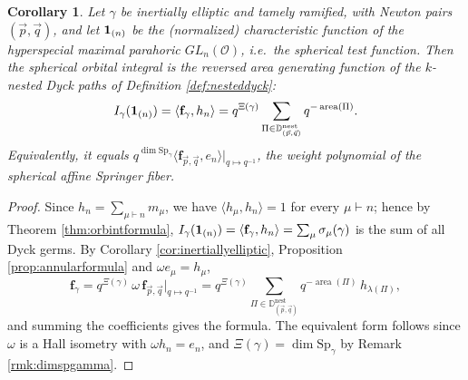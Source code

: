 \documentclass{amsart}
\numberwithin{equation}{section}
\newtheorem{corollary}[lemma]{Corollary}%
\theoremstyle{definition}
\def\16{{\bf 16}}
\def\1{{\bf 1}}
\def\Sp{{\mathrm{Sp}}}
\newcommand{\frs}{\mathbf{f}_{\vec{p},\vec{q}}}
\newcommand{\fpq}{\frs}
\newcommand{\fgamma}{\mathbf{f}_{\gamma}}
\newcommand{\cO}{\mathcal{O}}
\newcommand{\nDyck}{\mathbb{D}^{\mathrm{nest}}}
\DeclareMathOperator{\area}{\mathrm{area}}
\begin{document}
\begin{corollary}
\label{cor:sphericalorbital}
Let $\gamma$ be inertially elliptic and tamely ramified, with Newton pairs $(\vec p,\vec q)$, and let $\1_{(n)}$ be the (normalized) characteristic function of the hyperspecial maximal parahoric $GL_n(\cO)$, i.e.\ the spherical test function. Then the spherical orbital integral is the reversed area generating function of the $k$-nested Dyck paths of Definition \ref{def:nesteddyck}:
$$I_\gamma(\1_{(n)})=\langle\fgamma,h_n\rangle=q^{\Xi(\gamma)}\sum_{\Pi\in\nDyck_{(\vec p,\vec q)}}q^{-\area(\Pi)}.$$
Equivalently, it equals $q^{\dim\Sp_\gamma}\langle\fpq,e_n\rangle|_{q\mapsto q^{-1}}$, the weight polynomial of the spherical affine Springer fiber.
\end{corollary}
\begin{proof}
Since $h_n=\sum_{\mu\vdash n}m_\mu$, we have $\langle h_\mu,h_n\rangle=1$ for every $\mu\vdash n$; hence by Theorem \ref{thm:orbintformula}, $I_\gamma(\1_{(n)})=\langle\fgamma,h_n\rangle=\sum_{\mu}\sigma_\mu(\gamma)$ is the sum of all Dyck germs. By Corollary \ref{cor:inertiallyelliptic}, Proposition \ref{prop:annularformula} and $\omega e_\mu=h_\mu$,
$$\fgamma=q^{\Xi(\gamma)}\,\omega\,\fpq|_{q\mapsto q^{-1}}=q^{\Xi(\gamma)}\sum_{\Pi\in\nDyck_{(\vec p,\vec q)}}q^{-\area(\Pi)}\,h_{\lambda(\Pi)},$$
and summing the coefficients gives the formula. The equivalent form follows since $\omega$ is a Hall isometry with $\omega h_n=e_n$, and $\Xi(\gamma)=\dim\Sp_\gamma$ by Remark \ref{rmk:dimspgamma}.
\end{proof}
\end{document}
